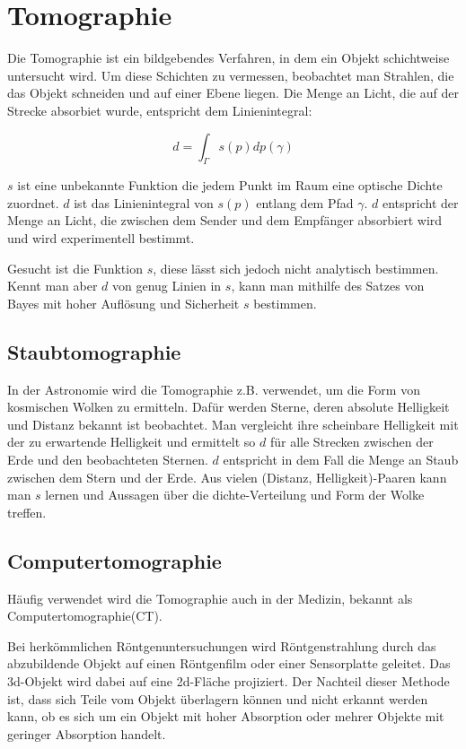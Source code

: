 \section{Tomographie}\label{k4.2.comptomo.ct}

Die Tomographie ist ein bildgebendes Verfahren, in dem ein Objekt schichtweise untersucht wird. Um diese Schichten zu vermessen, beobachtet man Strahlen, die das Objekt schneiden und auf einer Ebene liegen. Die Menge an Licht, die auf der Strecke absorbiet wurde, entspricht dem Linienintegral:

$$d=\int_{\Gamma}{}s(p)dp(\gamma)$$

$s$ ist eine unbekannte Funktion die jedem Punkt im Raum eine optische Dichte zuordnet. $d$ ist das Linienintegral von $s(p)$ entlang dem Pfad $\gamma$. $d$ entspricht der Menge an Licht, die zwischen dem Sender und dem Empfänger absorbiert wird und wird experimentell bestimmt.

Gesucht ist die Funktion $s$, diese lässt sich jedoch nicht analytisch bestimmen. Kennt man aber $d$ von genug Linien in $s$, kann man mithilfe des Satzes von Bayes mit hoher Auflösung und Sicherheit $s$ bestimmen.

\subsection{Staubtomographie}

In der Astronomie wird die Tomographie z.B. verwendet, um die Form von kosmischen Wolken zu ermitteln. Dafür werden Sterne, deren absolute Helligkeit und Distanz bekannt ist beobachtet. Man vergleicht ihre scheinbare Helligkeit mit der zu erwartende Helligkeit und ermittelt so $d$ für alle Strecken zwischen der Erde und den beobachteten Sternen. $d$ entspricht in dem Fall die Menge an Staub zwischen dem Stern und der Erde. Aus vielen (Distanz, Helligkeit)-Paaren kann man $s$ lernen und Aussagen über die dichte-Verteilung und Form der Wolke treffen.

\subsection{Computertomographie}

Häufig verwendet wird die Tomographie auch in der Medizin, bekannt als Computertomographie(CT).

Bei herkömmlichen Röntgenuntersuchungen wird Röntgenstrahlung durch das abzubildende Objekt auf einen Röntgenfilm oder einer Sensorplatte geleitet. Das 3d-Objekt wird dabei auf eine 2d-Fläche projiziert. Der Nachteil dieser Methode ist, dass sich Teile vom Objekt überlagern können und nicht erkannt werden kann, ob es sich um ein Objekt mit hoher Absorption oder mehrer Objekte mit geringer Absorption handelt.

